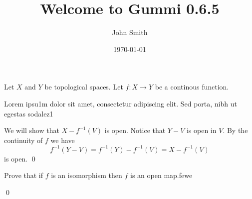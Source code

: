 \documentclass[11pt]{homework}
\title{\textbf{Welcome to Gummi 0.6.5}}
\author{John Smith}{1001274523}
\date{\today}
\begin{document}
\maketitle

\question
Let $X$ and $Y$ be topological spaces. Let $f:X \rightarrow Y$ be a continous function.

\qpart
Lorem ipsu1m dolor sit amet, consectetur adipiscing elit. Sed porta, nibh ut egestas sodalez1

\proof
We will show that $X - f^{-1}(V)$ is open. Notice that $Y -V$ is open in $V$. By the continuity of $f$ we have
$$
f^{-1}(Y - V) = f^{-1}(Y) - f^{-1}(V) = X - f^{-1}(V)
$$
is open. \qed 

\qpart
Prove that if $f$ is an isomorphism then $f$ is an open map.fewe

\solution

\proof
\qed
\end{document}
